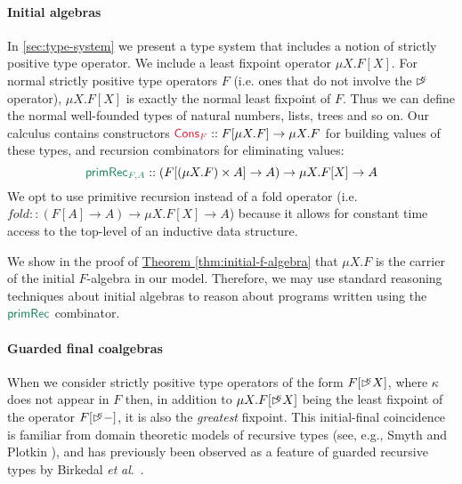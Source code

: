 \documentclass[natbib]{sigplanconf}
\newcommand{\cons}[1]{\textcolor{cons}{\textsf{#1}}}
\newcommand{\elim}[1]{\textcolor{elim}{\textsf{#1}}}
\newcommand{\ident}[1]{\textit{#1}}
\newcommand{\delay}[1]{\mathord{\rhd\kern-0.4em^{#1}}}
\newcommand{\thmref}[1]{\hyperref[#1]{Theorem \ref*{#1}}}
\newcommand{\etal}{\textit{et} \textit{al}.}
\begin{document}
\paragraph{Initial algebras}
In \autoref{sec:type-system} we present a type system that includes a
notion of strictly positive type operator. We include a least fixpoint
operator $\mu X. F[X]$. For normal strictly positive type operators
$F$ (i.e. ones that do not involve the $\delay\kappa$ operator), $\mu
X. F[X]$ is exactly the normal least fixpoint of $F$. Thus we can
define the normal well-founded types of natural numbers, lists, trees
and so on. Our calculus contains constructors $\cons{Cons$_F$} ::
F[\mu X. F] \to \mu X. F$ for building values of these types, and
recursion combinators for eliminating values:
\begin{displaymath}
  \elim{primRec$_{F,A}$} :: (F[(\mu X. F) \times A] \to A) \to \mu X. F[X] \to A 
\end{displaymath}
We opt to use primitive recursion instead of a fold operator
(i.e. $\ident{fold} :: (F[A] \to A) \to \mu X. F[X] \to A$) because
it allows for constant time access to the top-level of an inductive
data structure.

We show in the proof of \thmref{thm:initial-f-algebra} that $\mu X. F$
is the carrier of the initial $F$-algebra in our model. Therefore, we
may use standard reasoning techniques about initial algebras to reason
about programs written using the $\elim{primRec}$ combinator.

\paragraph{Guarded final coalgebras}
When we consider strictly positive type operators of the form
$F[\delay\kappa X]$, where $\kappa$ does not appear in $F$ then, in
addition to $\mu X. F[\delay\kappa X]$ being the least fixpoint of the
operator $F[\delay\kappa -]$, it is also the \emph{greatest}
fixpoint. This initial-final coincidence is familiar from domain
theoretic models of recursive types (see, e.g., Smyth and Plotkin
\cite{smyth82category}), and has previously been observed as a
feature of guarded recursive types by Birkedal
\etal~\cite{birkedal12first}.
\end{document}
